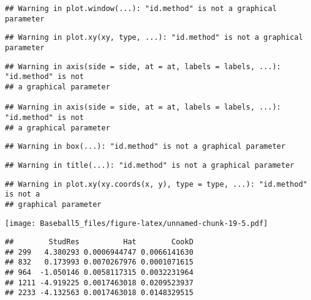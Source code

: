 \documentclass[
]{article}
\newenvironment{Shaded}{\begin{snugshade}}{\end{snugshade}}
\newcommand{\DecValTok}[1]{\textcolor[rgb]{0.00,0.00,0.81}{#1}}
\newcommand{\FunctionTok}[1]{\textcolor[rgb]{0.00,0.00,0.00}{#1}}
\newcommand{\NormalTok}[1]{#1}
\newcommand{\OtherTok}[1]{\textcolor[rgb]{0.56,0.35,0.01}{#1}}
\newcommand{\SpecialCharTok}[1]{\textcolor[rgb]{0.00,0.00,0.00}{#1}}
\begin{document}
\begin{verbatim}
## Warning in plot.window(...): "id.method" is not a graphical parameter
\end{verbatim}

\begin{verbatim}
## Warning in plot.xy(xy, type, ...): "id.method" is not a graphical parameter
\end{verbatim}

\begin{verbatim}
## Warning in axis(side = side, at = at, labels = labels, ...): "id.method" is not
## a graphical parameter

## Warning in axis(side = side, at = at, labels = labels, ...): "id.method" is not
## a graphical parameter
\end{verbatim}

\begin{verbatim}
## Warning in box(...): "id.method" is not a graphical parameter
\end{verbatim}

\begin{verbatim}
## Warning in title(...): "id.method" is not a graphical parameter
\end{verbatim}

\begin{verbatim}
## Warning in plot.xy(xy.coords(x, y), type = type, ...): "id.method" is not a
## graphical parameter
\end{verbatim}

\texttt{[image: Baseball5\_files/figure-latex/unnamed-chunk-19-5.pdf]}

\begin{verbatim}
##        StudRes          Hat        CookD
## 299   4.380293 0.0006944747 0.0066141630
## 832   0.173993 0.0070267976 0.0001071615
## 964  -1.050146 0.0058117315 0.0032231964
## 1211 -4.919225 0.0017463018 0.0209523937
## 2233 -4.132563 0.0017463018 0.0148329515
\end{verbatim}

\begin{Shaded}
\end{Shaded}
\end{document}
